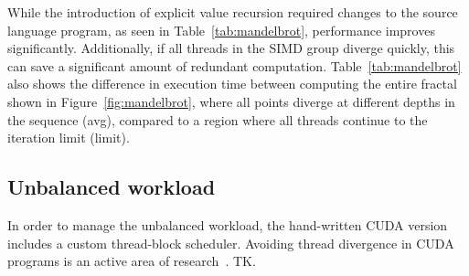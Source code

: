 While the introduction of explicit value recursion required changes to the
source language program, as seen in Table~\ref{tab:mandelbrot}, performance
improves significantly. Additionally, if all threads in the SIMD group diverge
quickly, this can save a significant amount of redundant computation.
Table~\ref{tab:mandelbrot} also shows the difference in execution time between
computing the entire fractal shown in Figure~\ref{fig:mandelbrot}, where all
points diverge at different depths in the sequence (avg), compared to a region
where all threads continue to the iteration limit (limit).


\subsection{Unbalanced workload}

In order to manage the unbalanced workload, the hand-written CUDA version
includes a custom thread-block scheduler. Avoiding thread divergence in CUDA
programs is an active area of research~\cite{Zhang:2010jc}. TK.

%
%
%

